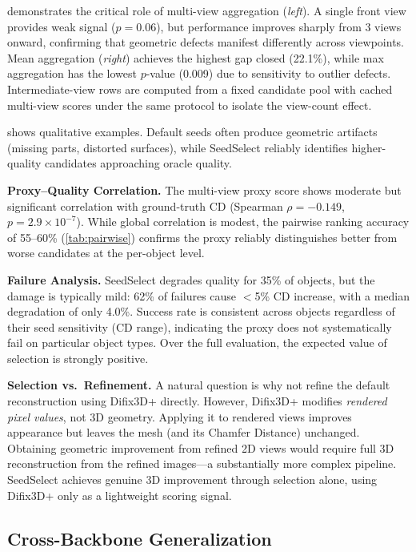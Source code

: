  demonstrates the critical role of multi-view aggregation (\emph{left}). A single front view provides weak signal ($p{=}0.06$), but performance improves sharply from 3 views onward, confirming that geometric defects manifest differently across viewpoints. Mean aggregation (\emph{right}) achieves the highest gap closed (22.1\%), while max aggregation has the lowest $p$-value (0.009) due to sensitivity to outlier defects. Intermediate-view rows are computed from a fixed candidate pool with cached multi-view scores under the same protocol to isolate the view-count effect.

 shows qualitative examples. Default seeds often produce geometric artifacts (missing parts, distorted surfaces), while SeedSelect reliably identifies higher-quality candidates approaching oracle quality.

\noindent\textbf{Proxy--Quality Correlation.}
The multi-view proxy score shows moderate but significant correlation with ground-truth CD (Spearman $\rho{=}{-}0.149$, $p{=}2.9 \times 10^{-7}$). While global correlation is modest, the pairwise ranking accuracy of 55--60\% (\cref{tab:pairwise}) confirms the proxy reliably distinguishes better from worse candidates at the per-object level.

\noindent\textbf{Failure Analysis.}
SeedSelect degrades quality for 35\% of objects, but the damage is typically mild: 62\% of failures cause $<$5\% CD increase, with a median degradation of only 4.0\%. Success rate is consistent across objects regardless of their seed sensitivity (CD range), indicating the proxy does not systematically fail on particular object types. Over the full evaluation, the expected value of selection is strongly positive.

\noindent\textbf{Selection vs.\ Refinement.}
A natural question is why not refine the default reconstruction using Difix3D+ directly. However, Difix3D+ modifies \emph{rendered pixel values}, not 3D geometry. Applying it to rendered views improves appearance but leaves the mesh (and its Chamfer Distance) unchanged. Obtaining geometric improvement from refined 2D views would require full 3D reconstruction from the refined images---a substantially more complex pipeline. SeedSelect achieves genuine 3D improvement through selection alone, using Difix3D+ only as a lightweight scoring signal.

\subsection{Cross-Backbone Generalization}
\label{sec:cross_backbone}

